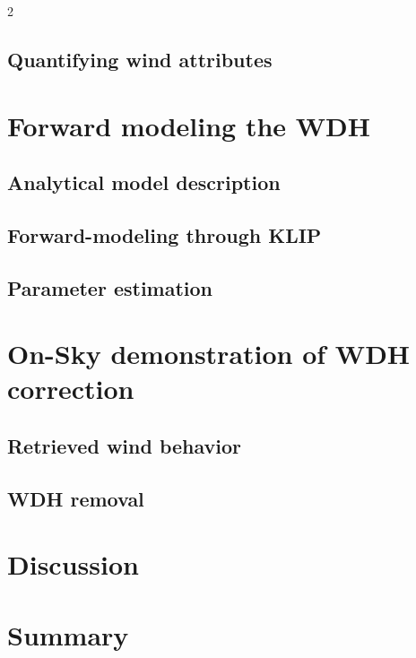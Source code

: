 \documentclass[12pt]{spieman}  %
\begin{document}
\begin{spacing}{2}
\subsection{Quantifying wind attributes}
\label{sect:quantifying-wind-attributes}

\section{Forward modeling the WDH}
\label{sect:forward-modeling}

\subsection{Analytical model description}
\label{sect:analytical-model-description}

\subsection{Forward-modeling through KLIP}
\label{sect:forward-modeling-through-klip}

\subsection{Parameter estimation}
\label{sect:parameter-estimation}

\section{On-Sky demonstration of WDH correction}
\label{sect:on-sky-demonstration}

\subsection{Retrieved wind behavior}
\label{sect:retrieved-wind-behavior}

\subsection{WDH removal}
\label{sect:wdh-removal}

\section{Discussion}
\label{sect:discussion}

\section{Summary}
\label{sect:summary}


\end{spacing}
\end{document}
